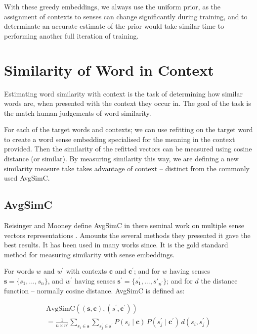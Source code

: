 \documentclass{sig-alternate}
\renewcommand{\c}{\mathbf{c}}
\newcommand{\s}{\mathbf{s}}
\begin{document}
With these greedy embeddings, we always use the uniform prior, as the assignment of contexts  to senses can change significantly during training, and to determinate an accurate estimate of the prior would take similar time to performing another full iteration of training.



\section{Similarity of Word in Context} \label{SimilarityInContext}
Estimating word similarity with context is the task of determining how similar words are, when presented with the context they occur in. The goal of the task is the match human judgements of word similarity.

For each of the target words and contexts; we can use refitting on the target word to create a word sense embedding specialised for the meaning in the context provided. Then the similarity of the refitted vectors can be measured using cosine distance (or similar).
By measuring similarity this way, we are defining a new similarity measure take takes advantage of context -- distinct from the commonly used AvgSimC.

\subsection{AvgSimC}
Reisinger and Mooney define AvgSimC in there seminal work on multiple sense vectors representations \parencite{Reisinger2010}. Amounts the several methods they presented it gave the best results. It has been used in many works since\cite{Huang2012, Chen2014, tian2014probabilistic}. It is the gold standard method for measuring similarity with sense embeddings.

For words $w$ and $w^\prime$ with contexts $\c$ and $\c^\prime$; and for $w$ having senses $\s=\{s_1,...,s_n\}$, and $w^\prime$ having senses $\s^\prime=\{s^\prime_1,...,s\prime_{n^\prime}\}$; and for $d$ the distance function -- normally cosine distance. AvgSimC is defined as:

\begin{multline} \label{eq:avgsimc}
\mathrm{AvgSimC}((\s,\c),(s^{\prime},\c^{\prime})) \\
=  \frac{1}{n \times n^{\prime}}
\sum_{s_{i}\in\s}
\sum_{s_{j}^{\prime}\in\s^{\prime}}
P(s_{i}\mid\c)\,P(s_{j}^{\prime}\mid\c^{\prime})\,d(s_{i},s_{j}^{\prime})
\end{multline}
\end{document}
